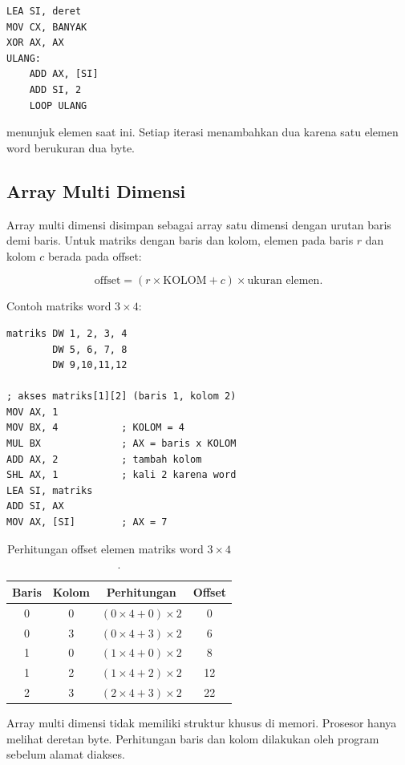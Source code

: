 \begin{lstlisting}[language=MASM, numbers=none]
LEA SI, deret
MOV CX, BANYAK
XOR AX, AX
ULANG:
    ADD AX, [SI]
    ADD SI, 2
    LOOP ULANG
\end{lstlisting}

 menunjuk elemen saat ini. Setiap iterasi menambahkan dua
karena satu elemen word berukuran dua byte.

\subsection{Array Multi Dimensi}

Array multi dimensi disimpan sebagai array satu dimensi dengan urutan
baris demi baris. Untuk matriks dengan  baris dan
 kolom, elemen pada baris $r$ dan kolom $c$ berada pada
offset:

\[
    \text{offset} = (r \times \text{KOLOM} + c) \times
    \text{ukuran elemen}.
\]

Contoh matriks word $3 \times 4$:

\begin{lstlisting}[language=MASM, numbers=none]
matriks DW 1, 2, 3, 4
        DW 5, 6, 7, 8
        DW 9,10,11,12

; akses matriks[1][2] (baris 1, kolom 2)
MOV AX, 1
MOV BX, 4           ; KOLOM = 4
MUL BX              ; AX = baris x KOLOM
ADD AX, 2           ; tambah kolom
SHL AX, 1           ; kali 2 karena word
LEA SI, matriks
ADD SI, AX
MOV AX, [SI]        ; AX = 7
\end{lstlisting}

\begin{table}[H]
    \centering
    \caption{Perhitungan offset elemen matriks word $3 \times 4$.}
    \label{tab:offset-matriks}
    \small
    \begin{tabular}{@{}cccc@{}}
        \toprule
        \textbf{Baris} & \textbf{Kolom} & \textbf{Perhitungan} &
        \textbf{Offset} \\
        \midrule
        0 & 0 & $(0 \times 4 + 0) \times 2$ & 0 \\
        0 & 3 & $(0 \times 4 + 3) \times 2$ & 6 \\
        1 & 0 & $(1 \times 4 + 0) \times 2$ & 8 \\
        1 & 2 & $(1 \times 4 + 2) \times 2$ & 12 \\
        2 & 3 & $(2 \times 4 + 3) \times 2$ & 22 \\
        \bottomrule
    \end{tabular}
\end{table}

\begin{infobox}
\vspace{1.1em}
Array multi dimensi tidak memiliki struktur khusus di memori.
Prosesor hanya melihat deretan byte. Perhitungan baris dan kolom
dilakukan oleh program sebelum alamat diakses.
\end{infobox}

